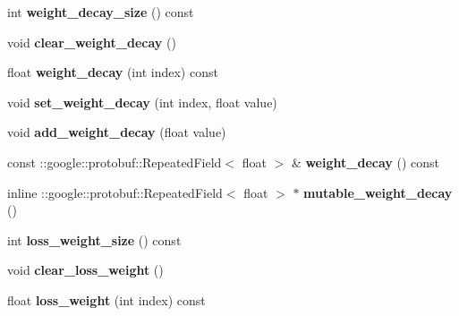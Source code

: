 \begin{DoxyCompactItemize}
int {\bfseries weight\+\_\+decay\+\_\+size} () const
\item 
\mbox{\label{classcaffe_1_1_v1_layer_parameter_a646489cb4bb8ced2cdfbee97a62bc412}} 
void {\bfseries clear\+\_\+weight\+\_\+decay} ()
\item 
\mbox{\label{classcaffe_1_1_v1_layer_parameter_a9f30f4976a26d877ae1208ec4dfc67db}} 
float {\bfseries weight\+\_\+decay} (int index) const
\item 
\mbox{\label{classcaffe_1_1_v1_layer_parameter_ab66339489d377143635fecba9570f037}} 
void {\bfseries set\+\_\+weight\+\_\+decay} (int index, float value)
\item 
\mbox{\label{classcaffe_1_1_v1_layer_parameter_add7792b4047dfd972307a3d85200fe85}} 
void {\bfseries add\+\_\+weight\+\_\+decay} (float value)
\item 
\mbox{\label{classcaffe_1_1_v1_layer_parameter_adf90d8e00a3239d206a1ec7376483a7a}} 
const \+::google\+::protobuf\+::\+Repeated\+Field$<$ float $>$ \& {\bfseries weight\+\_\+decay} () const
\item 
\mbox{\label{classcaffe_1_1_v1_layer_parameter_aa9486ca79779cdf27b7404fbec279629}} 
inline \+::google\+::protobuf\+::\+Repeated\+Field$<$ float $>$ $\ast$ {\bfseries mutable\+\_\+weight\+\_\+decay} ()
\item 
\mbox{\label{classcaffe_1_1_v1_layer_parameter_a50d6ef8191c56e618d3657235c6f5741}} 
int {\bfseries loss\+\_\+weight\+\_\+size} () const
\item 
\mbox{\label{classcaffe_1_1_v1_layer_parameter_a6b33bbe354426fd644e5e32c71256fe4}} 
void {\bfseries clear\+\_\+loss\+\_\+weight} ()
\item 
\mbox{\label{classcaffe_1_1_v1_layer_parameter_a2321f971e6df789f416f2d985ac5d177}} 
float {\bfseries loss\+\_\+weight} (int index) const
\item 

\end{DoxyCompactItemize}
